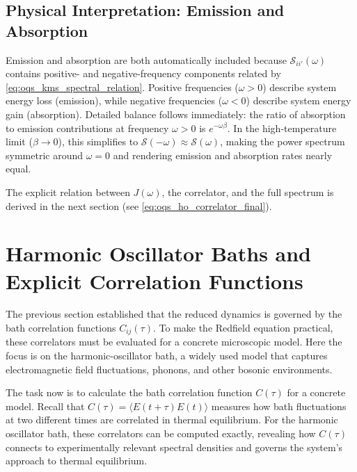 \subsection{Physical Interpretation: Emission and Absorption}
\label{subsec:oqs_physical_emission_absorption}

Emission and absorption are both automatically included because $\mathcal{S}_{ii'}(\omega)$ contains positive- and negative-frequency components related by \autoref{eq:oqs_kms_spectral_relation}. Positive frequencies ($\omega>0$) describe system energy loss (emission), while negative frequencies ($\omega<0$) describe system energy gain (absorption). Detailed balance follows immediately: the ratio of absorption to emission contributions at frequency $\omega>0$ is $e^{- \omega \beta}$. In the high-temperature limit ($\beta \to 0$), this simplifies to $\mathcal{S}(-\omega)\approx \mathcal{S}(\omega)$, making the power spectrum symmetric around $\omega = 0$ and rendering emission and absorption rates nearly equal.

The explicit relation between $J(\omega)$, the correlator, and the full spectrum is derived in the next section (see \autoref{eq:oqs_ho_correlator_final}).



\section{Harmonic Oscillator Baths and Explicit Correlation Functions}
\label{sec:oqs_harmonic_oscillator_baths}

The previous section established that the reduced dynamics is governed by the bath correlation functions $C_{ij}(\tau)$. To make the Redfield equation practical, these correlators must be evaluated for a concrete microscopic model. Here the focus is on the harmonic-oscillator bath, a widely used model that captures electromagnetic field fluctuations, phonons, and other bosonic environments.


The task now is to calculate the bath correlation function $C(\tau)$ for a concrete model. Recall that $C(\tau)=\langle E(t+\tau)E(t)\rangle$ measures how bath fluctuations at two different times are correlated in thermal equilibrium. For the harmonic oscillator bath, these correlators can be computed exactly, revealing how $C(\tau)$ connects to experimentally relevant spectral densities and governs the system's approach to thermal equilibrium.

